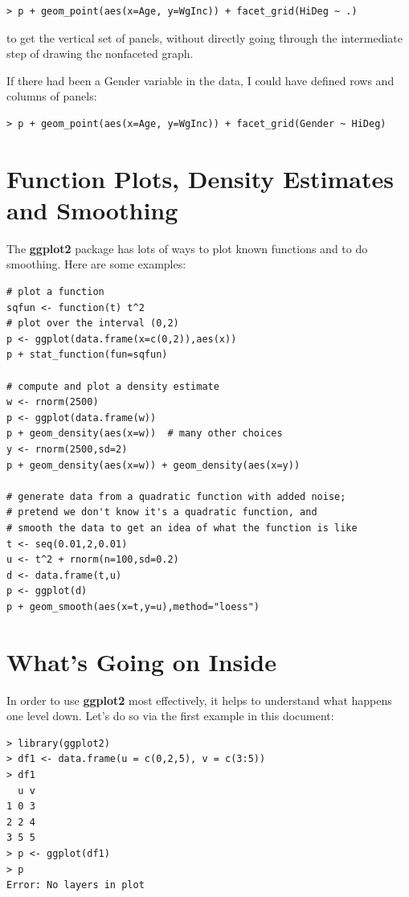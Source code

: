\begin{lstlisting}
> p + geom_point(aes(x=Age, y=WgInc)) + facet_grid(HiDeg ~ .)
\end{lstlisting}

to get the vertical set of panels, without directly going through the
intermediate step of drawing the nonfaceted graph.

If there had been a Gender variable in the data, I could have defined
rows and columns of panels:

\begin{lstlisting}
> p + geom_point(aes(x=Age, y=WgInc)) + facet_grid(Gender ~ HiDeg)
\end{lstlisting}

\section{Function Plots, Density Estimates and Smoothing}
\label{ggplot2dens}

The {\bf ggplot2} package has lots of ways to plot known functions and
to do smoothing.  Here are some examples:

\begin{lstlisting}
# plot a function
sqfun <- function(t) t^2
# plot over the interval (0,2)
p <- ggplot(data.frame(x=c(0,2)),aes(x))
p + stat_function(fun=sqfun)

# compute and plot a density estimate
w <- rnorm(2500)
p <- ggplot(data.frame(w))
p + geom_density(aes(x=w))  # many other choices
y <- rnorm(2500,sd=2)
p + geom_density(aes(x=w)) + geom_density(aes(x=y))

# generate data from a quadratic function with added noise;
# pretend we don't know it's a quadratic function, and
# smooth the data to get an idea of what the function is like
t <- seq(0.01,2,0.01)
u <- t^2 + rnorm(n=100,sd=0.2)
d <- data.frame(t,u)
p <- ggplot(d)
p + geom_smooth(aes(x=t,y=u),method="loess")
\end{lstlisting}

\section{What's Going on Inside}

In order to use {\bf ggplot2} most effectively, it helps to understand
what happens one level down.  Let's do so via the first example in this
document:

\begin{lstlisting}
> library(ggplot2)
> df1 <- data.frame(u = c(0,2,5), v = c(3:5))
> df1
  u v
1 0 3
2 2 4
3 5 5
> p <- ggplot(df1)
> p
Error: No layers in plot
\end{lstlisting}

